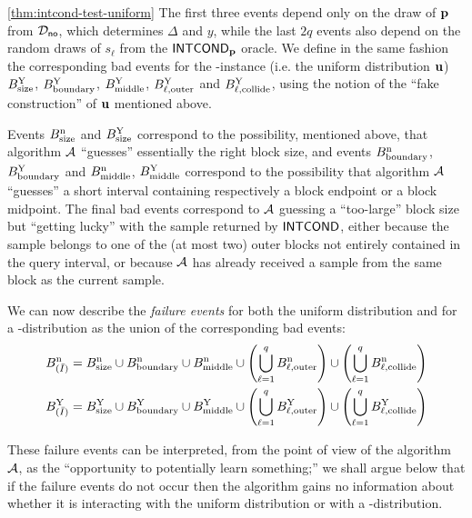 \begin{proofof}{\cref{thm:intcond-test-uniform}}
The first three events depend only on the draw of $\mathbf{p}$ from $\mathcal{D}_{\textsf{no}}$, which determines $\Delta$ and $y$,
while the last $2q$ events also depend on the random draws of $s_\ell$
from the ${\sf INTCOND}_{\mathbf{p}}$ oracle. We define in the same fashion the corresponding
bad events for the \yes-instance (i.e. the uniform
distribution $\mathbf{u}$) $B^{\rm Y}_{\rm size}$, $B^{\rm Y}_{\rm boundary}$, $B^{\rm Y}_{\rm middle}$,
$B^{\rm Y}_{\ell,\rm outer}$ and $B^{\rm Y}_{\ell,\rm collide}$,
using the notion of the ``fake construction'' of $\mathbf{u}$ mentioned above.


Events $B^{\rm n}_{\rm size}$ and $B^{\rm Y}_{\rm size}$
correspond to the possibility, mentioned above, that algorithm $\mathcal{A}$
``guesses'' essentially the right block size, and events
$B^{\rm n}_{\rm boundary}$, $B^{\rm Y}_{\rm boundary}$ and $B^{\rm n}_{\rm middle}$, $B^{\rm Y}_{\rm middle}$
correspond to the possibility that algorithm $\mathcal{A}$ ``guesses'' a short
interval containing respectively a block endpoint or a block midpoint.
The final bad events correspond to $\mathcal{A}$ guessing a ``too-large'' block size
but ``getting lucky'' with the sample returned by ${\sf INTCOND}$, either because the
sample belongs to one of the (at most two) outer blocks not entirely
contained in the query interval, or because $\mathcal{A}$ has already received a
sample from the same block as the current sample.



We can now describe the \emph{failure events} for both the uniform distribution
and for a \no-distribution as the union of the corresponding bad events:
  \begin{align*}
    B^{\rm n}_{(\bar{I})} &= B^{\rm n}_{\rm size}\cup B^{\rm n}_{\rm boundary}\cup  B^{\rm n}_{\rm middle}\cup\left( \bigcup_{\ell=1}^q B^{\rm n}_{\ell,\rm outer} \right)\cup\left( \bigcup_{\ell=1}^q B^{\rm n}_{\ell,\rm collide} \right)\\
    B^{\rm Y}_{(\bar{I})} &= B^{\rm Y}_{\rm size}\cup B^{\rm Y}_{\rm boundary}\cup B^{\rm Y}_{\rm middle}\cup\left( \bigcup_{\ell=1}^q B^{\rm Y}_{\ell,\rm outer} \right)\cup\left( \bigcup_{\ell=1}^q B^{\rm Y}_{\ell,\rm collide} \right)
  \end{align*}

These failure events can be interpreted, from the point of view of the
algorithm $\mathcal{A}$, as the ``opportunity to potentially learn
something;'' we shall argue below that if the failure events do not
occur then the algorithm gains no information about whether it is interacting
with the uniform distribution or with a \no-distribution.


\end{proofof}
